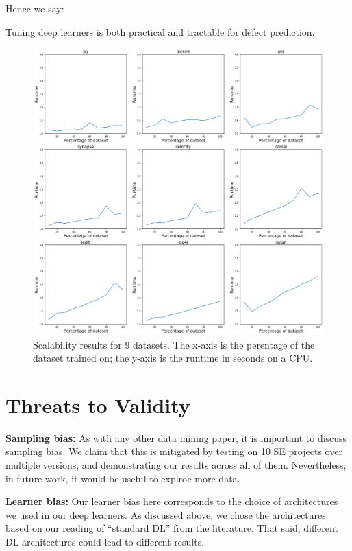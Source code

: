 \documentclass[10pt,compsoc,twocolumn]{IEEEtran}
\begin{document}
Hence we say: 
\begin{blockquote}
    \noindent
    Tuning deep learners is both practical and tractable for defect prediction.
\end{blockquote}



\begin{figure}[!t]
    \centering
    \includegraphics[width=\linewidth]{scalability.png}
    \caption{Scalability results for 9 datasets. The x-axis is the perentage of the dataset trained on; the y-axis is the runtime in seconds on a CPU.}
    \label{fig:scalability}
\end{figure}

\section{Threats to Validity}
\label{sec:threats}
 
 
\textbf{Sampling bias:} As with any other data mining paper, it is important to discuss sampling bias. We claim that this is mitigated by testing on 10 SE projects over multiple versions, and demonstrating our results across all of them. Nevertheless, in future work, it would be useful to explroe more data. 

\textbf{Learner bias:} Our learner bias here corresponds to the choice of architectures we used in our deep learners. As discussed above, we chose the architectures based on our reading of ``standard DL'' from the literature. That said, different DL architectures could lead to different results.
\end{document}
